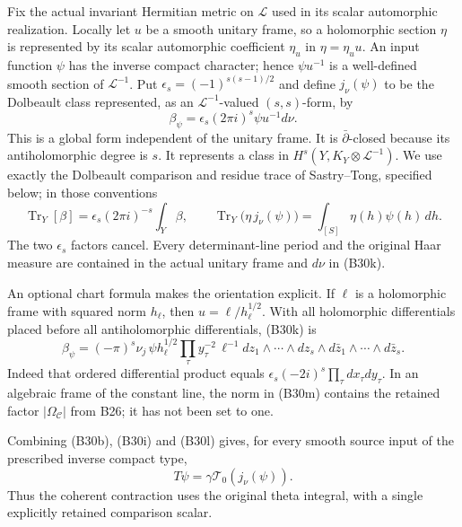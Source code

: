 Fix the actual invariant Hermitian metric on $\mathscr L$ used in
its scalar automorphic realization.  Locally let $u$ be a smooth
unitary frame, so a holomorphic section $\eta$ is represented by
its scalar automorphic coefficient $\eta_u$ in $\eta=\eta_u u$.
An input function $\psi$ has the inverse compact character; hence
$\psi u^{-1}$ is a well-defined smooth section of $\mathscr L^{-1}$.
Put $\epsilon_s=(-1)^{s(s-1)/2}$ and define $j_\nu(\psi)$ to be the
Dolbeault class represented, as an $\mathscr L^{-1}$-valued
$(s,s)$-form, by
\[
       \beta_\psi=\epsilon_s(2\pi i)^s
                            \psi u^{-1}d\nu.
 \tag{B30k}
\]
This is a global form independent of the unitary frame.  It is
$\bar\partial$-closed because its antiholomorphic degree is $s$.
It represents a class in $H^s(Y,K_Y\otimes\mathscr L^{-1})$.
We use exactly the Dolbeault comparison and residue trace of
Sastry--Tong, specified below; in those conventions
\[
 \operatorname{Tr}_Y[\beta]
       =\epsilon_s(2\pi i)^{-s}\int_Y\beta,
 \qquad
 \operatorname{Tr}_Y\bigl(\eta\,j_\nu(\psi)\bigr)
                        =\int_{[S]}\eta(h)\psi(h)\,dh.
 \tag{B30l}
\]
The two $\epsilon_s$ factors cancel.  Every determinant-line period
and the original Haar measure are contained in the actual unitary
frame and $d\nu$ in (B30k).

An optional chart formula makes the orientation explicit.  If
$\ell$ is a holomorphic frame with squared norm $h_\ell$, then
$u=\ell/h_\ell^{1/2}$.  With all holomorphic differentials placed
before all antiholomorphic differentials, (B30k) is
\[
 \beta_\psi=(-\pi)^s\nu_j\,
       \psi h_\ell^{1/2}\prod_\tau y_\tau^{-2}\,
       \ell^{-1}dz_1\wedge\cdots\wedge dz_s
                       \wedge d\bar z_1\wedge\cdots\wedge d\bar z_s.
 \tag{B30m}
\]
Indeed that ordered differential product equals
$\epsilon_s(-2i)^s\prod_\tau dx_\tau dy_\tau$.
In an algebraic frame of the constant line, the norm in (B30m)
contains the retained factor $|\Omega_{\mathscr C}|$ from B26;
it has not been set to one.

Combining (B30b), (B30i) and (B30l) gives, for every smooth
source input of the prescribed inverse compact type,
\[
                       T\psi=\gamma\mathcal T_0(j_\nu(\psi)).
 \tag{B30n}
\]
Thus the coherent contraction uses the original theta integral,
with a single explicitly retained comparison scalar.

